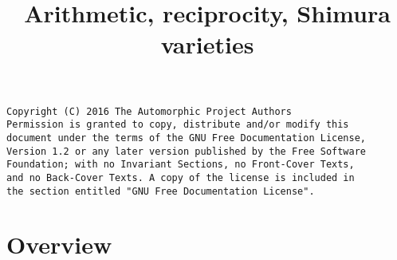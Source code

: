 

%

\newcommand{\TAG}{ZZZZ}

\title{Arithmetic, reciprocity, Shimura varieties}


\maketitle

\label{section-phantom}
\hypertarget{0800}{}
\reversemarginpar{}

\begin{verbatim}
Copyright (C) 2016 The Automorphic Project Authors
Permission is granted to copy, distribute and/or modify this
document under the terms of the GNU Free Documentation License,
Version 1.2 or any later version published by the Free Software
Foundation; with no Invariant Sections, no Front-Cover Texts,
and no Back-Cover Texts. A copy of the license is included in
the section entitled "GNU Free Documentation License".
\end{verbatim}

\tableofcontents


\section{Overview}
\label{section-overview}
\hypertarget{0801}{}
\reversemarginpar{}







